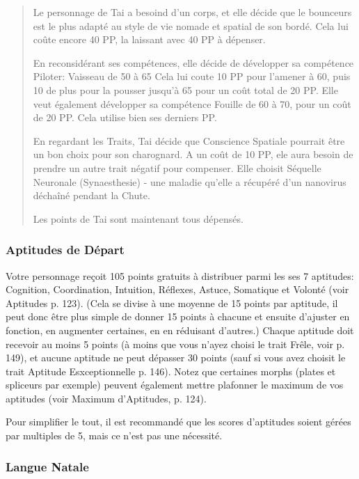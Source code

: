 \begin{quotation}
Le personnage de Tai a besoind d'un corps, et elle décide que le bounceurs est le plus adapté au style de vie nomade et spatial de son bordé. Cela lui coûte encore 40 PP, la laissant avec 40 PP à dépenser. 

En reconsidérant ses compétences, elle décide de développer sa compétence Piloter: Vaisseau de 50 à 65 Cela lui coute 10 PP pour l'amener à 60, puis 10 de plus pour la pousser jusqu'à 65 pour un coût total de 20 PP. Elle veut également développer sa compétence Fouille de 60 à 70, pour un coût de 20 PP. Cela utilise bien ses derniers PP. 

En regardant les Traits, Tai décide que Conscience Spatiale pourrait être un bon choix pour son charognard. A un coût de 10 PP, ele aura besoin de prendre un autre trait négatif pour compenser. Elle choisit Séquelle Neuronale (Synaesthesie) - une maladie qu'elle a récupéré d'un nanovirus déchaîné pendant la Chute. 

Les points de Tai sont maintenant tous dépensés. \end{quotation} 

\subsubsection{Aptitudes de Départ} \label{sec:starting-aptitudes} 

Votre personnage reçoit 105 points gratuits à distribuer parmi les ses 7 aptitudes: Cognition, Coordination, Intuition, Réflexes, Astuce, Somatique et Volonté (voir Aptitudes p. 123). (Cela se divise à une moyenne de 15 points par aptitude, il peut donc être plus simple de donner 15 points à chacune et ensuite d'ajuster en fonction, en augmenter certaines, en en réduisant d'autres.) Chaque aptitude doit recevoir au moins 5 points (à moins que vous n'ayez choisi le trait Frêle, voir p. 149), et aucune aptitude ne peut dépasser 30 points (sauf si vous avez choisit le trait Aptitude Esxceptionnelle p. 146). Notez que certaines morphs (plates et spliceurs par exemple) peuvent également mettre plafonner le maximum de vos aptitudes (voir Maximum d'Aptitudes, p. 124). 

Pour simplifier le tout, il est recommandé que les scores d'aptitudes soient gérées par multiples de 5, mais ce n'est pas une nécessité. 

\subsubsection{Langue Natale} \label{sec:native-tongue} 

